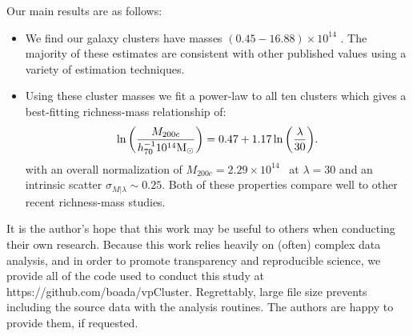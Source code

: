 Our main results are as follows:
\begin{itemize}
	\item We find our galaxy clusters have masses $(0.45-16.88)\times10^{14}$ \Msol. The majority of these estimates are consistent with other published values using a variety of estimation techniques.
	\item Using these cluster masses we fit a power-law to all ten clusters which gives a best-fitting richness-mass relationship of:
	\begin{equation}
		\ln\bigg{(}\frac{M_{200c}}{h_{70}^{-1} 10^{14}\hbox{$\mathrm{M}_\odot$}}\bigg{)} = 0.47 + 1.17 \ln\bigg{(}\frac{\lambda}{30}\bigg{)}.
	\end{equation}
	with an overall normalization of $M_{200c} = 2.29 \times10^{14}$ \Msol\ at $\lambda=30$ and an intrinsic scatter $\sigma_{M|\lambda} \sim 0.25$. Both of these properties compare well to other recent richness-mass studies.
\end{itemize}

It is the author's hope that this work may be useful to others when conducting their own research. Because this work relies heavily on (often) complex data analysis, and in order to promote transparency and reproducible science, we provide all of the code used to conduct this study at https://github.com/boada/vpCluster. Regrettably, large file size prevents including the source data with the analysis routines. The authors are happy to provide them, if requested.
